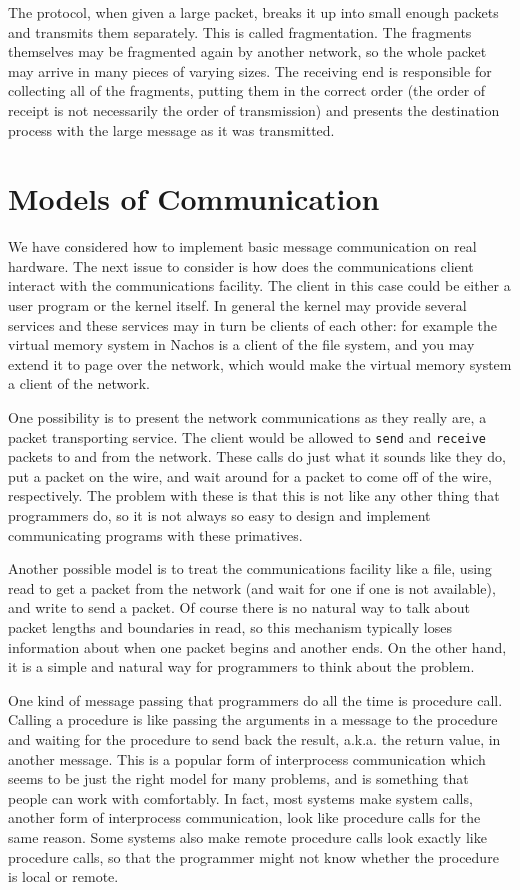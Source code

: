 The protocol, when given a large packet, breaks it up into small enough
packets and transmits them separately.  This is called fragmentation.
The fragments 
themselves may be fragmented again by another network, so the whole
packet may arrive in many pieces of varying sizes.
The receiving end is responsible
for collecting all of the fragments, putting them in the correct order
(the order of receipt is not necessarily the order of transmission) and
presents the destination process with the large message as it was
transmitted.

\section{Models of Communication}

We have considered how to implement basic message communication on real
hardware.  The next issue to consider is how does the
communications client interact with the communications facility.
The client in this case could be either a user program or the kernel
itself.  In general the kernel may provide several services and these
services may in turn be clients of each other: for example the virtual
memory system in Nachos is a client of the file system, and you may
extend it to page over the network, which would make the virtual memory
system a client of the network.

One possibility is to present the network communications as they
really are, a packet transporting service.  The client would be allowed
to {\tt send} and {\tt receive} packets to and from the network.
These calls do just what it sounds like they do, put
a packet on the wire, and wait around for a packet to come off
of the wire, respectively.
The problem with these is that this is not like any other thing that
programmers do, so it is not always so easy to design and implement
communicating programs with these primatives.

Another possible model is to treat the communications
facility like a file, using read to get a packet from the network (and
wait for one if one is not available), and write to send a packet.  Of course
there is no natural way to talk about packet lengths and boundaries in read,
so this mechanism typically loses information about when one packet begins
and another ends.  On the other hand, it is a simple and natural way for
programmers to think about the problem.

One kind of message passing that programmers do all the time is procedure
call.  Calling a procedure is like passing the arguments in a message to
the procedure and waiting for the procedure to send back the result,
a.k.a. the return value, 
in another message.  This is a popular form of interprocess
communication which seems to be just the right model for many problems, and
is something that people can work with comfortably.  In fact, most systems
make system calls, another form of interprocess communication, look like
procedure calls for the same reason.  Some systems also make remote procedure
calls look exactly like procedure calls, so that the programmer might not
know whether the procedure is local or remote.

